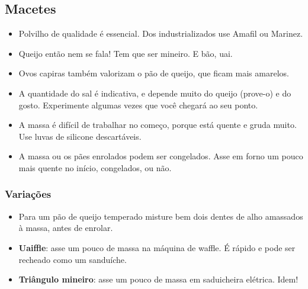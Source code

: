 \subsection*{Macetes}
\begin{itemize}
\item Polvilho de qualidade é essencial. Dos industrializados use Amafil ou Marinez.
\item Queijo então nem se fala! Tem que ser mineiro. E bão, uai.
\item Ovos capiras também valorizam o pão de queijo, que ficam mais amarelos.
\item A quantidade do sal é indicativa, e depende muito do queijo (prove-o) e do gosto. Experimente algumas vezes que você chegará ao seu ponto.
\item A massa é difícil de trabalhar no começo, porque está quente e gruda muito. Use luvas de silicone descartáveis.
\item A massa ou os pães enrolados podem ser congelados. Asse em forno um pouco mais quente no início, congelados, ou não.
\end{itemize}

\subsubsection*{Variações}
\begin{itemize}
\item Para um pão de queijo temperado misture bem dois dentes de alho amassados à massa, antes de enrolar.
\item \textbf{Uaiffle}: asse um pouco de massa na máquina de waffle. É rápido e pode ser recheado como um sanduíche.
\item \textbf{Triângulo mineiro}: asse um pouco de massa em saduicheira elétrica. Idem!
\end{itemize}
\pagebreak



  
  
  
  
  